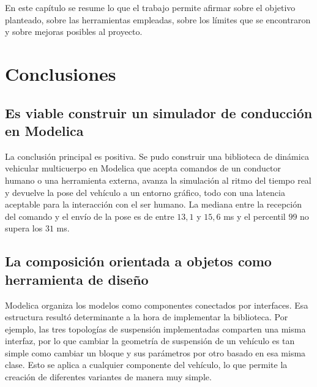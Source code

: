 En este capítulo se resume lo que el trabajo permite afirmar sobre el objetivo planteado, sobre las herramientas empleadas, sobre los límites que se encontraron y sobre mejoras posibles al proyecto.

\section{Conclusiones}

\subsection*{Es viable construir un simulador de conducción en Modelica}

La conclusión principal es positiva. Se pudo construir una biblioteca de dinámica vehicular multicuerpo en Modelica que acepta comandos de un conductor humano o una herramienta externa, avanza la simulación al ritmo del tiempo real y devuelve la pose del vehículo a un entorno gráfico, todo con una latencia aceptable para la interacción con el ser humano. La mediana entre la recepción del comando y el envío de la pose es de entre $13{,}1$ y $15{,}6$ ms  y el percentil $99$ no supera los $31$ ms.




\subsection*{La composición orientada a objetos como herramienta de diseño}

Modelica organiza los modelos como componentes conectados por interfaces. Esa estructura resultó determinante a la hora de implementar la biblioteca. Por ejemplo, las tres topologías de suspensión implementadas comparten una misma interfaz, por lo que cambiar la geometría de suspensión de un vehículo es tan simple como cambiar un bloque y sus parámetros por otro basado en esa misma clase. Esto se aplica a cualquier componente del vehículo, lo que permite la creación de diferentes variantes de manera muy simple.

